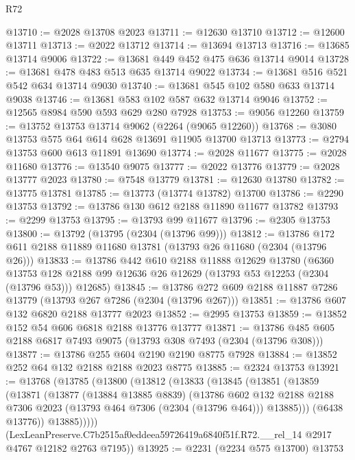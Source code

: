 \begin{lexlean}{R72}
\begin{coremodule}
@13710 := @2028 @13708 @2023
@13711 := @12630 @13710
@13712 := @12600 @13711
@13713 := @2022 @13712
@13714 := @13694 @13713
@13716 := @13685 @13714 @9006
@13722 := @13681 @449 @452 @475 @636 @13714 @9014
@13728 := @13681 @478 @483 @513 @635 @13714 @9022
@13734 := @13681 @516 @521 @542 @634 @13714 @9030
@13740 := @13681 @545 @102 @580 @633 @13714 @9038
@13746 := @13681 @583 @102 @587 @632 @13714 @9046
@13752 := @12565 @8984 @590 @593 @629 @280 @7928
@13753 := @9056 @12260
@13759 := @13752 @13753 @13714 @9062 (@2264 (@9065 @12260))
@13768 := @3080 @13753 @575 @64 @614 @628 @13691 @11905 @13700 @13713
@13773 := @2794 @13753 @600 @613 @11891 @13690
@13774 := @2028 @11677
@13775 := @2028 @11680
@13776 := @13540 @9075
@13777 := @2022 @13776
@13779 := @2028 @13777 @2023
@13780 := @7548 @13779
@13781 := @12630 @13780
@13782 := @13775 @13781
@13785 := @13773 (@13774 @13782) @13700
@13786 := @2290 @13753
@13792 := @13786 @130 @612 @2188 @11890 @11677 @13782
@13793 := @2299 @13753
@13795 := @13793 @99 @11677
@13796 := @2305 @13753
@13800 := @13792 (@13795 (@2304 (@13796 @99)))
@13812 := @13786 @172 @611 @2188 @11889 @11680 @13781 (@13793 @26 @11680 (@2304 (@13796 @26)))
@13833 := @13786
    @442
    @610
    @2188
    @11888
    @12629
    @13780
    (@6360 @13753 @128 @2188 @99 @12636 @26 @12629 (@13793 @53 @12253 (@2304 (@13796 @53))) @12685)
@13845 := @13786 @272 @609 @2188 @11887 @7286 @13779 (@13793 @267 @7286 (@2304 (@13796 @267)))
@13851 := @13786 @607 @132 @6820 @2188 @13777 @2023
@13852 := @2995 @13753
@13859 := @13852 @152 @54 @606 @6818 @2188 @13776 @13777
@13871 := @13786 @485 @605 @2188 @6817 @7493 @9075 (@13793 @308 @7493 (@2304 (@13796 @308)))
@13877 := @13786 @255 @604 @2190 @2190 @8775 @7928
@13884 := @13852 @252 @64 @132 @2188 @2188 @2023 @8775
@13885 := @2324 @13753
@13921 := @13768
    (@13785
      (@13800
        (@13812
          (@13833
            (@13845
              (@13851
                (@13859
                  (@13871
                    (@13877
                      (@13884 @13885 @8839)
                      (@13786
                        @602
                        @132
                        @2188
                        @2188
                        @7306
                        @2023
                        (@13793 @464 @7306 (@2304 (@13796 @464)))
                        @13885)))
                  (@6438 @13776))
                @13885)))))
      (LexLeanPreserve.C7b2515af0eddeea59726419a6840f51f.R72.__rel_14
        @2917
        @4767
        @12182
        @2763
        @7195))
@13925 := @2231 (@2234 @575 @13700) @13753

\end{coremodule}
\end{lexlean}
